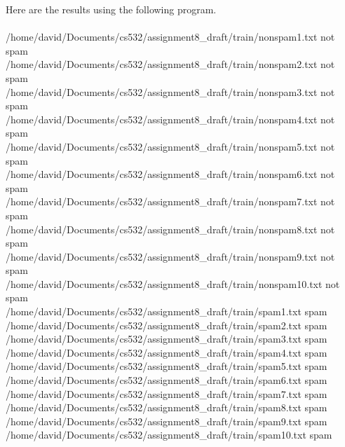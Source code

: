 \documentclass[10pt,letterpaper]{article}
\begin{document}
Here are the results using the following program.\\
\\
/home/david/Documents/cs532/assignment8\_draft/train/nonspam1.txt not spam\\
/home/david/Documents/cs532/assignment8\_draft/train/nonspam2.txt not spam\\
/home/david/Documents/cs532/assignment8\_draft/train/nonspam3.txt not spam\\
/home/david/Documents/cs532/assignment8\_draft/train/nonspam4.txt not spam\\
/home/david/Documents/cs532/assignment8\_draft/train/nonspam5.txt not spam\\
/home/david/Documents/cs532/assignment8\_draft/train/nonspam6.txt not spam\\
/home/david/Documents/cs532/assignment8\_draft/train/nonspam7.txt not spam\\
/home/david/Documents/cs532/assignment8\_draft/train/nonspam8.txt not spam\\
/home/david/Documents/cs532/assignment8\_draft/train/nonspam9.txt not spam\\
/home/david/Documents/cs532/assignment8\_draft/train/nonspam10.txt not spam\\
/home/david/Documents/cs532/assignment8\_draft/train/spam1.txt spam\\
/home/david/Documents/cs532/assignment8\_draft/train/spam2.txt spam\\
/home/david/Documents/cs532/assignment8\_draft/train/spam3.txt spam\\
/home/david/Documents/cs532/assignment8\_draft/train/spam4.txt spam\\
/home/david/Documents/cs532/assignment8\_draft/train/spam5.txt spam\\
/home/david/Documents/cs532/assignment8\_draft/train/spam6.txt spam\\
/home/david/Documents/cs532/assignment8\_draft/train/spam7.txt spam\\
/home/david/Documents/cs532/assignment8\_draft/train/spam8.txt spam\\
/home/david/Documents/cs532/assignment8\_draft/train/spam9.txt spam\\
/home/david/Documents/cs532/assignment8\_draft/train/spam10.txt spam\\
\\
\pagebreak 
\end{document}
